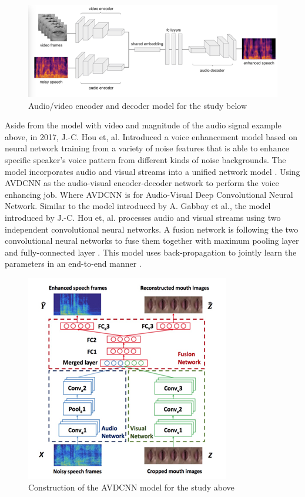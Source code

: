 \documentclass[runningheads,a4paper]{llncs}
\begin{document}
\begin{figure}[H]
\includegraphics[scale=0.60]{fig4.png}
\caption{Audio/video encoder and decoder model for the study below}
\label{fig:framework}
\end{figure}
 
Aside from the model with video and magnitude of the audio signal example above, \cite{11} in 2017, J.-C. Hou et, al. Introduced a voice enhancement model based on neural network training from a variety of noise features that is able to enhance specific speaker’s voice pattern from different kinds of noise backgrounds. The model incorporates audio and visual streams into a unified network model \cite{12}. Using AVDCNN as the audio-visual encoder-decoder network to perform the voice enhancing job. Where AVDCNN is for Audio-Visual Deep Convolutional Neural Network. Similar to the model introduced by A. Gabbay et al., the model introduced by J.-C. Hou et, al. processes audio and visual streams using two independent convolutional neural networks. A fusion network is following the two convolutional neural networks to fuse them together with maximum pooling layer and fully-connected layer \cite{11}.
This model uses back-propagation to jointly learn the parameters in an end-to-end manner \cite{12}.\\

\begin{figure}[H]
\includegraphics[scale=0.38]{fig5.png}
\caption{Construction of the AVDCNN model for the study above}
\label{fig:framework}
\end{figure}
\end{document}
